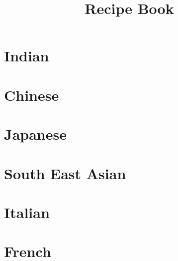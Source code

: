 \documentclass[a4paper,12pt]{book}
\title{Recipe Book}
\author{}
\date{}
\newcommand{\invisiblechapter}[1]{%
  \refstepcounter{chapter}%
  \addcontentsline{toc}{chapter}{\protect\numberline{\thechapter}#1}%
  \chaptermark{#1}}
\begin{document}
\maketitle
\tableofcontents
\chapter{Indian}








\chapter{Chinese}







\chapter{Japanese}



\chapter{South East Asian}








\chapter{Italian}






\chapter{French}


\end{document}
